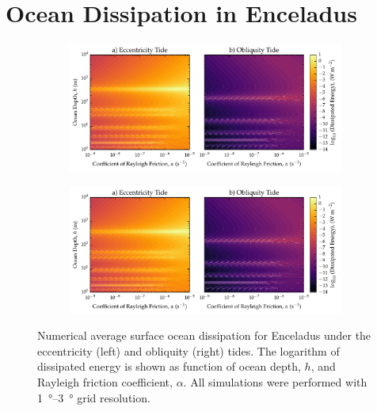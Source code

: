 \section{Ocean Dissipation in Enceladus \label{sec:results_Enceladus}}

\begin{figure}[!t]
    \centering
    \begin{subfigure}[t]{0.85\linewidth} %
        \includegraphics[width=\linewidth]{Figures/enceladus_linear}
        \label{fig:lincEccEncel}
    \end{subfigure}
    \begin{subfigure}[t]{0\linewidth} %
         \includegraphics[width=\linewidth]{Figures/enceladus_linear}
         \label{fig:linObliqEncel} 
    \end{subfigure}
    \vspace{-0.5cm}
\caption{Numerical average surface ocean dissipation for Enceladus under the eccentricity (left) and obliquity (right) tides. The logarithm of dissipated energy is shown as function of ocean depth, $h$, and Rayleigh friction coefficient, $\alpha$. All simulations were performed with \SIrange{1}{3}{\degree} grid resolution. \label{fig:linEncel}}
\end{figure}

